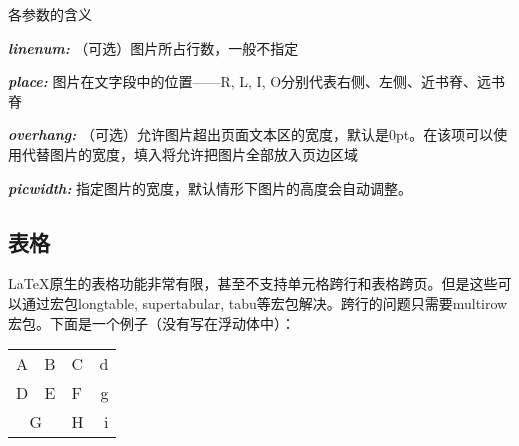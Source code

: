{各参数的含义
\begin{inlinee}
\item {\bfseries\itshape linenum:} （可选）图片所占行数，一般不指定
\item {\bfseries\itshape place:} 图片在文字段中的位置——R, L, I, O分别代表右侧、左侧、近书脊、远书脊
\item {\bfseries\itshape overhang:} （可选）允许图片超出页面文本区的宽度，默认是0pt。在该项可以使用\latexline{\\width}代替图片的宽度，填入\latexline{\\width}将允许把图片全部放入页边区域
\item {\bfseries\itshape picwidth:} 指定图片的宽度，默认情形下图片的高度会自动调整。
\end{inlinee}

\subsection{表格}
\LaTeX 原生的表格功能非常有限，甚至不支持单元格跨行和表格跨页。但是这些可以通过宏包longtable, supertabular, tabu等宏包解决。跨行的问题只需要multirow宏包。下面是一个例子（没有写在浮动体中）：

\begin{codeshow}
\begin{center}
  \begin{tabular}[c]{|l|c||p{3em}
    r@{-}} \hline\hline
    A & B & C & d\\D & E & F & g\\
    \cline{1-2}
    \multicolumn{2}{|c|}{G}&H&i\\
    \hline
  \end{tabular}
\end{center}
\end{codeshow}

}
